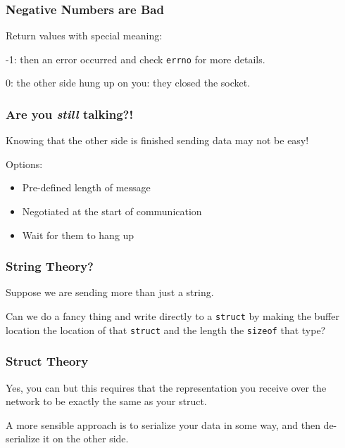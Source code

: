 \begin{frame}
	\frametitle{Negative Numbers are Bad}

	Return values with special meaning:

	-1:  then an error occurred and check \texttt{errno} for more details.

	0: the other side hung up on you: they closed the socket.
\end{frame}

\begin{frame}
	\frametitle{Are you \textit{still} talking?!}

	Knowing that the other side is finished sending data may not be easy!

	Options:

	\begin{itemize}
		\item Pre-defined length of message
		\item Negotiated at the start of communication
		\item Wait for them to hang up
	\end{itemize}

\end{frame}



\begin{frame}
	\frametitle{String Theory?}
	Suppose we are sending more than just a string.

	Can we do a fancy thing and write directly to a \texttt{struct} by making the buffer location the location of that \texttt{struct} and the length the \texttt{sizeof} that type?

\end{frame}



\begin{frame}
	\frametitle{Struct Theory}

	Yes, you can but this requires that the representation you receive over the network to be exactly the same as your struct.

	A more sensible approach is to serialize your data in some way, and then de-serialize it on the other side.

\end{frame}



